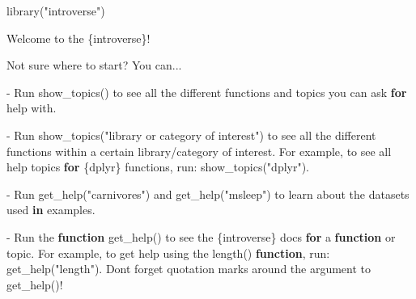 \documentclass[
  10pt,
  italian,
  a4paper,
  extrafontsizes,onecolumn,openright
  ]{memoir}
\newenvironment{Shaded}{\begin{snugshade}}{\end{snugshade}}
\newcommand{\AttributeTok}[1]{\textcolor[rgb]{0.77,0.63,0.00}{#1}}
\newcommand{\ControlFlowTok}[1]{\textcolor[rgb]{0.13,0.29,0.53}{\textbf{#1}}}
\newcommand{\FunctionTok}[1]{\textcolor[rgb]{0.00,0.00,0.00}{#1}}
\newcommand{\NormalTok}[1]{#1}
\newcommand{\SpecialCharTok}[1]{\textcolor[rgb]{0.00,0.00,0.00}{#1}}
\newcommand{\StringTok}[1]{\textcolor[rgb]{0.31,0.60,0.02}{#1}}
\begin{document}
\begin{Shaded}
\begin{Highlighting}[]
\FunctionTok{library}\NormalTok{(}\StringTok{"introverse"}\NormalTok{)}
\end{Highlighting}
\end{Shaded}

\begin{Shaded}
\begin{Highlighting}[]
\NormalTok{Welcome to the \{introverse\}}\SpecialCharTok{!}

\NormalTok{Not sure where to start? You can...}

\SpecialCharTok{{-}}\NormalTok{ Run }\FunctionTok{show\_topics}\NormalTok{() to see all the different functions }
\NormalTok{  and topics you can ask }\ControlFlowTok{for}\NormalTok{ help with.}
  
\SpecialCharTok{{-}}\NormalTok{ Run }\FunctionTok{show\_topics}\NormalTok{(}\StringTok{"library or category of interest"}\NormalTok{) to see }
\NormalTok{  all the different functions within a certain library}\SpecialCharTok{/}\NormalTok{category }
\NormalTok{  of interest. For example, to see all help topics }\ControlFlowTok{for}\NormalTok{ \{dplyr\}}
\NormalTok{  functions, run}\SpecialCharTok{:} \FunctionTok{show\_topics}\NormalTok{(}\StringTok{"dplyr"}\NormalTok{).}

\SpecialCharTok{{-}}\NormalTok{ Run }\FunctionTok{get\_help}\NormalTok{(}\StringTok{"carnivores"}\NormalTok{) and }\FunctionTok{get\_help}\NormalTok{(}\StringTok{"msleep"}\NormalTok{) to learn }
\NormalTok{  about the datasets used }\ControlFlowTok{in}\NormalTok{ examples.}
    
\SpecialCharTok{{-}}\NormalTok{ Run the }\ControlFlowTok{function} \FunctionTok{get\_help}\NormalTok{() to see the \{introverse\} docs}
  \ControlFlowTok{for}\NormalTok{ a }\ControlFlowTok{function}\NormalTok{ or topic. For example, to get help using }
\NormalTok{  the }\StringTok{\textasciigrave{}}\AttributeTok{length()}\StringTok{\textasciigrave{}} \ControlFlowTok{function}\NormalTok{, run}\SpecialCharTok{:} \FunctionTok{get\_help}\NormalTok{(}\StringTok{"length"}\NormalTok{).}
\NormalTok{  Don}\StringTok{\textquotesingle{}t forget quotation marks around the argument to get\_help()!}
\end{Highlighting}
\end{Shaded}



\end{document}
